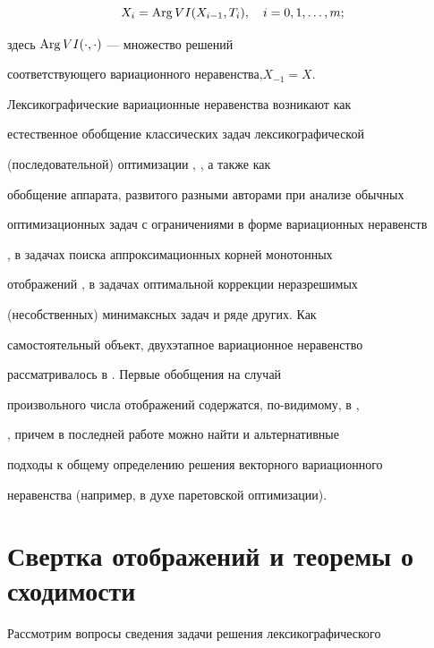 \begin{equation}


\label{F1}


X_i=\Arg VI (X_{i-1}, T_i),\quad i=0,1,\dotsc, m;


\end{equation}


здесь $\operatorname{Arg} VI(\cdot, \cdot)$ --- множество решений


соответствующего вариационного неравенства,\linebreak $X_{-1}=X$.





Лексикографические вариационные неравенства возникают как


естественное обобщение классических задач лексикографической


(последовательной) оптимизации \cite{4}, \cite{5}, а также как


обобщение аппарата, развитого разными авторами при анализе обычных


оптимизационных задач с ограничениями в форме вариационных неравенств


\cite{6}, в задачах поиска аппроксимационных корней монотонных


отображений \cite{7}, в задачах оптимальной коррекции неразрешимых


(несобственных) минимаксных задач \cite{8} и ряде других. Как


самостоятельный объект, двухэтапное вариационное неравенство


рассматривалось в \cite{9}. Первые обобщения на случай


произвольного числа отображений содержатся, по-видимому, в \cite{10},


\cite{11}, причем в последней работе можно найти и альтернативные


подходы к общему определению решения векторного вариационного


неравенства (например, в духе паретовской оптимизации).








\section{Свертка отображений и теоремы о сходимости}





Рассмотрим вопросы сведения задачи решения лексикографического


